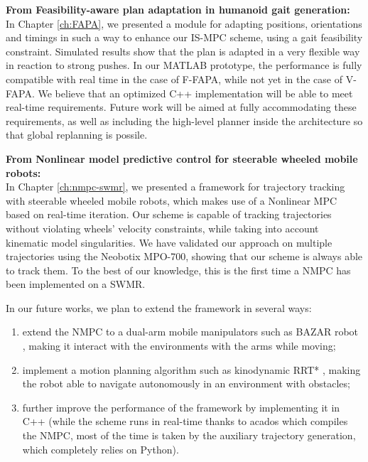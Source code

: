 \textbf{From Feasibility-aware plan adaptation in humanoid gait generation:}\\
In Chapter \ref{ch:FAPA}, we presented a module for adapting positions, orientations and timings in
such a way to enhance our IS-MPC scheme, using a gait feasibility constraint.
Simulated results show that the plan is adapted in a very flexible way in
reaction to strong pushes. In our MATLAB prototype, the performance is fully
compatible with real time in the case of F-FAPA, while not yet in the case of
V-FAPA. We believe that an optimized C++ implementation will be able to meet
real-time requirements. Future work will be aimed at fully accommodating these
requirements, as well as including the high-level planner
\cite{Cipriano2023RAS} inside the architecture so that global replanning
is possile.

\textbf{From Nonlinear model predictive control for steerable wheeled mobile robots:}\\
In Chapter \ref{ch:nmpc-swmr}, we presented a framework for trajectory tracking with steerable wheeled mobile robots, which makes use of a Nonlinear MPC based on real-time iteration. Our scheme is capable of tracking trajectories without violating wheels' velocity constraints, while taking into account kinematic model singularities. We have validated our approach on multiple trajectories using the Neobotix MPO-700, showing that our scheme is always able to track them. To the best of our knowledge, this is the first time a NMPC has been implemented on a SWMR.

In our future works, we plan to extend the framework in several ways:
\begin{enumerate}
    \item extend the NMPC to a dual-arm mobile manipulators such as BAZAR robot \cite{Cherubini2019ACR}, making it interact with the environments with the arms while moving;
    \item implement a motion planning algorithm such as kinodynamic RRT* \cite{Webb2013KinodynamicRRTstar}, making the robot able to navigate autonomously in an environment with obstacles;
    \item further improve the performance of the framework by implementing it in C++ (while the scheme runs in real-time thanks to acados which compiles the NMPC, most of the time is taken by the auxiliary trajectory generation, which completely relies on Python).
\end{enumerate}
